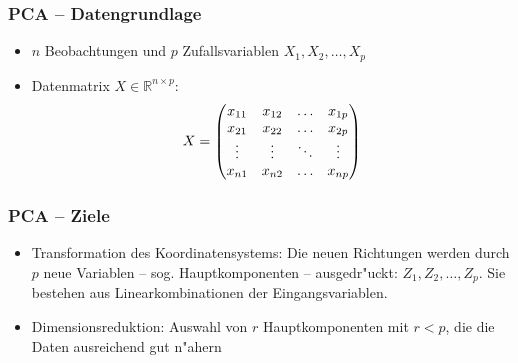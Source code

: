 \begin{frame}

\frametitle{PCA -- Datengrundlage}

\begin{itemize}
\setlength{\itemsep}{20pt}
\item $n$ Beobachtungen und $p$ Zufallsvariablen $X_1,X_2,\ldots,X_p$
\item Datenmatrix $X \in \mathbb{R}^{n \times p}$: \\
\begin{equation}
X=\begin{pmatrix}
x_{11} & x_{12} & \hdots & x_{1p} \\
x_{21} & x_{22} & \hdots & x_{2p} \\
\vdots & \vdots & \ddots & \vdots \\
x_{n1} & x_{n2} & \hdots & x_{np}
\end{pmatrix} \notag
\end{equation}
\end{itemize}

\end{frame}







\begin{frame}

\frametitle{PCA -- Ziele}

\begin{itemize}
\setlength{\itemsep}{15pt}
\item Transformation des Koordinatensystems: Die neuen Richtungen werden durch $p$ neue Variablen -- sog. Hauptkomponenten -- ausgedr"uckt: $Z_1,Z_2,\ldots,Z_p$. Sie bestehen aus Linearkombinationen der Eingangsvariablen.
\item Dimensionsreduktion: Auswahl von $r$ Hauptkomponenten mit $r<p$, die die Daten ausreichend gut n"ahern
\end{itemize}

\end{frame}








